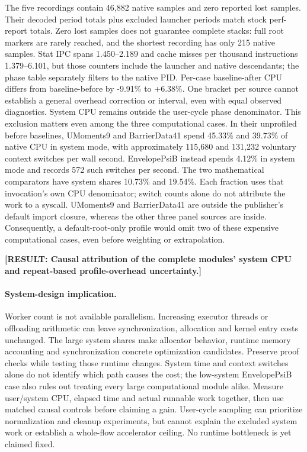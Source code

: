 \documentclass[10pt,twocolumn]{article}
\newcommand{\missing}[1]{\textbf{[RESULT: #1]}}
\begin{document}
The five recordings contain 46,882 native samples and zero reported lost
samples. Their decoded period totals plus excluded launcher periods match
stock perf-report totals.
Zero lost samples does not guarantee complete stacks: full root markers
are rarely reached, and the shortest recording has only 215 native samples.
Stat IPC spans 1.450--2.189 and cache misses per thousand instructions
1.379--6.101, but those counters include the launcher and native descendants;
the phase table separately filters to the native PID.
Per-case baseline-after CPU differs from baseline-before by -9.91\% to
+6.38\%. One bracket per source cannot establish a general overhead
correction or interval, even with equal observed diagnostics.
System CPU remains outside the user-cycle phase denominator.
This exclusion matters even among the three computational cases.
In their unprofiled before baselines, UMoments9 and BarrierData41 spend
45.33\% and 39.73\% of native CPU in system mode, with approximately
115,680 and 131,232 voluntary context switches per wall second.
EnvelopePsiB instead spends 4.12\% in system mode and records 572 such
switches per second. The two mathematical comparators have system shares
10.73\% and 19.54\%. Each fraction uses that invocation's own CPU
denominator; switch counts alone do not attribute the work to a syscall.
UMoments9 and BarrierData41 are outside the publisher's default import
closure, whereas the other three panel sources are inside.
Consequently, a default-root-only profile would omit two of these
expensive computational cases, even before weighting or extrapolation.

\missing{Causal attribution of the complete modules' system CPU and
repeat-based profile-overhead uncertainty.}

\paragraph{System-design implication.}
Worker count is not available parallelism. Increasing executor threads or
offloading arithmetic can leave synchronization, allocation and kernel
entry costs unchanged. The large system shares make allocator behavior,
runtime memory accounting and synchronization concrete optimization
candidates. Preserve proof checks while testing those runtime changes.
System time and context switches alone do not identify which path causes
the cost; the low-system EnvelopePsiB case also rules out treating every
large computational module alike.
Measure user/system CPU, elapsed time and actual runnable work together,
then use matched causal controls before claiming a gain.
User-cycle sampling can prioritize normalization and cleanup experiments,
but cannot explain the excluded system work or establish a whole-flow
accelerator ceiling. No runtime bottleneck is yet claimed fixed.
\end{document}
